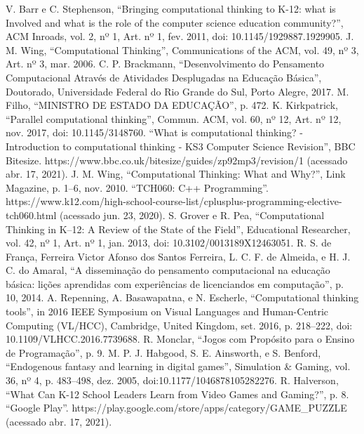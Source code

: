 \documentclass[conference]{IEEEtran}
\begin{document}
\begin{thebibliography}{23}
 V. Barr e C. Stephenson, ``Bringing computational thinking to K-12: what is Involved and what is the role of the computer science education community?'', ACM Inroads, vol. 2, nº 1, Art. nº 1, fev. 2011, doi: 10.1145/1929887.1929905.
 J. M. Wing, ``Computational Thinking'', Communications of the ACM, vol. 49, nº 3, Art. nº 3, mar. 2006.
 C. P. Brackmann, ``Desenvolvimento do Pensamento Computacional Através de Atividades Desplugadas na Educação Básica'', Doutorado, Universidade Federal do Rio Grande do Sul, Porto Alegre, 2017.
 M. Filho, ``MINISTRO DE ESTADO DA EDUCAÇÃO'', p. 472.
 K. Kirkpatrick, ``Parallel computational thinking'', Commun. ACM, vol. 60, nº 12, Art. nº 12, nov. 2017, doi: 10.1145/3148760.
 ``What is computational thinking? - Introduction to computational thinking - KS3 Computer Science Revision'', BBC Bitesize. https://www.bbc.co.uk/bitesize/guides/zp92mp3/revision/1 (acessado abr. 17, 2021).
 J. M. Wing, ``Computational Thinking: What and Why?'', Link Magazine, p. 1–6, nov. 2010.
 ``TCH060: C++ Programming''. https://www.k12.com/high-school-course-list/cplusplus-programming-elective-tch060.html (acessado jun. 23, 2020).
 S. Grover e R. Pea, ``Computational Thinking in K–12: A Review of the State of the Field'', Educational Researcher, vol. 42, nº 1, Art. nº 1, jan. 2013, doi: 10.3102/0013189X12463051.
 R. S. de França, Ferreira Victor Afonso dos Santos Ferreira, L. C. F. de Almeida, e H. J. C. do Amaral, ``A disseminação do pensamento computacional na educação básica: lições aprendidas com experiências de licenciandos em computação'', p. 10, 2014.
 A. Repenning, A. Basawapatna, e N. Escherle, ``Computational thinking tools'', in 2016 IEEE Symposium on Visual Languages and Human-Centric Computing (VL/HCC), Cambridge, United Kingdom, set. 2016, p. 218–222, doi: 10.1109/VLHCC.2016.7739688.
 R. Monclar, ``Jogos com Propósito para o Ensino de Programação'', p. 9.
 M. P. J. Habgood, S. E. Ainsworth, e S. Benford, ``Endogenous fantasy and learning in digital games'', Simulation \& Gaming, vol. 36, nº 4, p. 483–498, dez. 2005, doi:10.1177/1046878105282276.
 R. Halverson, ``What Can K-12 School Leaders Learn from Video Games and Gaming?'', p. 8.
 ``Google Play''. https://play.google.com/store/apps/category/\linebreak GAME\_PUZZLE (acessado abr. 17, 2021).

\end{thebibliography}
\end{document}

